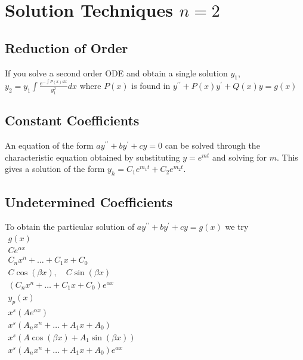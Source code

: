 \documentclass[10pt,landscape,letterpaper]{cheatsheet}
\begin{document}
\section*{Solution Techniques $n=2$}
\subsection*{Reduction of Order}
If you solve a second order ODE and obtain a single solution $y_1$, $y_2=y_1\int \frac{e^{-\int P(x)dx}}{y_1^2}dx$ where $P(x)$ is found in $y^{\prime\prime}+P(x)y^{\prime}+Q(x)y=g(x)$
\subsection*{Constant Coefficients}
An equation of the form $ay^{\prime\prime}+by^{\prime}+cy=0$ can be solved through the characteristic equation obtained by substituting $y=e^{mt}$ and solving for $m$.
This gives a solution of the form $y_h=C_1e^{m_1t}+C_2e^{m_2t}$.
\subsection*{Undetermined Coefficients}
To obtain the particular solution of $ay^{\prime\prime}+by^{\prime}+cy=g(x)$ we try
$
        \begin{array}{|c|}
                \hline
                g(x)                                                                  \\
                \hline
                Ce^{\alpha x}                                                         \\
                C_nx^n+\dots+C_1x+C_0                                                 \\
                C\cos\left(\beta x\right), \quad C\sin\left(\beta x\right)            \\
                \left(C_nx^n+\dots+C_1x+C_0\right)e^{\alpha x}                        \\
                \hline
                y_p(x)                                                                \\
                \hline
                x^s\left(Ae^{\alpha x}\right)                                         \\
                x^s\left(A_nx^n+\dots+A_1x+A_0\right)                                 \\
                x^s\left(A\cos\left(\beta x\right)+A_1\sin\left(\beta x\right)\right) \\
                x^s\left(A_nx^n+\dots+A_1x+A_0\right)e^{\alpha x}
        \end{array}
$
\end{document}
